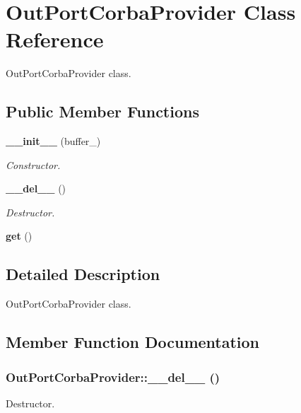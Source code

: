 \section{Out\-Port\-Corba\-Provider Class Reference}
\label{classOutPortCorbaProvider}
Out\-Port\-Corba\-Provider class.  


\subsection*{Public Member Functions}
\begin{CompactItemize}
\item 
{\bf \_\-\_\-init\_\-\_\-} (buffer\_\-)
\begin{CompactList}\small\item\em Constructor. \item\end{CompactList}\item 
{\bf \_\-\_\-del\_\-\_\-} ()
\begin{CompactList}\small\item\em Destructor. \item\end{CompactList}\item 
{\bf get} ()
\end{CompactItemize}


\subsection{Detailed Description}
Out\-Port\-Corba\-Provider class. 



\subsection{Member Function Documentation}
\subsubsection{\setlength{\rightskip}{0pt plus 5cm}Out\-Port\-Corba\-Provider::\_\-\_\-del\_\-\_\- ()}\label{classOutPortCorbaProvider_OutPortCorbaProvidera1}


Destructor. 

